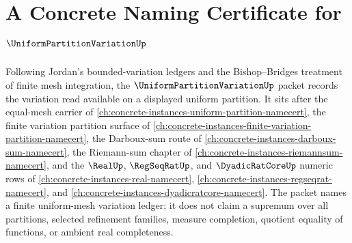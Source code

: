 \chapter{A Concrete Naming Certificate for $\UniformPartitionVariationUp$}
\label{ch:concrete-instances-uniform-partition-variation-namecert}

Following Jordan's bounded-variation ledgers and the Bishop--Bridges treatment of finite mesh integration, the $\UniformPartitionVariationUp$ packet records the variation read available on a displayed uniform partition. It sits after the equal-mesh carrier of \autoref{ch:concrete-instances-uniform-partition-namecert}, the finite variation partition surface of \autoref{ch:concrete-instances-finite-variation-partition-namecert}, the Darboux-sum route of \autoref{ch:concrete-instances-darboux-sum-namecert}, the Riemann-sum chapter of \autoref{ch:concrete-instances-riemannsum-namecert}, and the $\RealUp$, $\RegSeqRatUp$, and $\DyadicRatCoreUp$ numeric rows of \autoref{ch:concrete-instances-real-namecert}, \autoref{ch:concrete-instances-regseqrat-namecert}, and \autoref{ch:concrete-instances-dyadicratcore-namecert}. The packet names a finite uniform-mesh variation ledger; it does not claim a supremum over all partitions, selected refinement families, measure completion, quotient equality of functions, or ambient real completeness.

